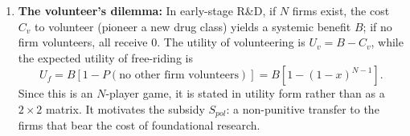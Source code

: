 \documentclass[10pt]{article}
\begin{document}
\begin{enumerate}
\begin{equation}
\begin{blockarray}{ccc}
 & \text{comply} & \text{defect} \\
\begin{block}{c(cc)}
 \text{comply} & R-C_{base},\;R-C_{base} & R-C_{base}-\Delta,\;R \\
 \text{defect} & R,\;R-C_{base}-\Delta & R-\alpha,\;R-\alpha \\
\end{block}
\end{blockarray}
\label{eq:payoffpd}
\end{equation}
where $\Delta$ is the first-mover loss suffered by a complying firm whose rival reaches market first. This is a prisoner's dilemma whenever $0 < C_{base}<\alpha<C_{base}+\Delta$: defection is dominant although mutual compliance is better for both. The first-mover loss $\Delta$ is not separately identifiable from the composite indices, so in the calibrated model the content of this game is carried by the baseline cost $C_{base}>0$, which makes defection the better response in the absence of inspection or scrutiny when $C_{base} > \alpha$.
    \item \textbf{The volunteer's dilemma:} In early-stage R\&D, if $N$ firms exist, the cost $C_v$ to volunteer (pioneer a new drug class) yields a systemic benefit $B$; if no firm volunteers, all receive $0$. The utility of volunteering is $U_v = B - C_v$, while the expected utility of free-riding is
\begin{equation*}
U_{f} = B \left[1 - P(\text{no other firm volunteers})\right] = B\left[1 - (1-x)^{N-1}\right].
\end{equation*} Since this is an $N$-player game, it is stated in utility form rather than as a $2\times2$ matrix. It motivates the subsidy $S_{pol}$: a non-punitive transfer to the firms that bear the cost of foundational research.
\end{enumerate}
\end{document}
